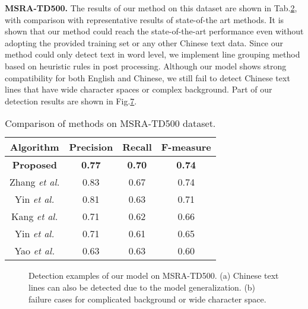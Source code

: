 \documentclass[10pt,twocolumn,letterpaper]{article}
\begin{document}
	\noindent \textbf{MSRA-TD500.} The results of our method on this dataset are shown in Tab.\hyperref[Tab.2]{2}, with comparison with representative results of state-of-the art methods.
	It is shown that our method could reach the state-of-the-art performance even without adopting the provided training set or any other Chinese text data. 
	Since our method could only detect text in word level, we implement line grouping method based on heuristic rules in post processing. 
	Although our model shows strong compatibility for both English and Chinese, we still fail to detect Chinese text lines that have wide character spaces or complex background. 
	Part of our detection results are shown in Fig.\hyperref[Fig.7]{7}.
	
	\begin{table}
		\label{Tab.2}
		\small
		\renewcommand\arraystretch{1.2}
		\centering
		\caption{Comparison of methods on MSRA-TD500 dataset.}
		\begin{tabular}{|c|c|c|c|}
			\hline
			Algorithm & Precision & Recall & F-measure \\
			\hline
			\hline
			\textbf{Proposed} & \textbf{0.77} & \textbf{0.70} & \textbf{0.74} \\
			\hline
			Zhang \emph{et al.} \cite{fcn-text} & 0.83 & 0.67 & 0.74 \\
			\hline
			Yin \emph{et al.} \cite{yin2015multi} & 0.81 & 0.63 & 0.71 \\ %
			\hline
			Kang \emph{et al.} \cite{kang2014orientation} & 0.71 & 0.62 & 0.66 \\ %
			\hline
			Yin \emph{et al.} \cite{mser2} & 0.71 & 0.61 & 0.65 \\ %
			\hline
			Yao \emph{et al.} \cite{yao2012detecting} & 0.63 & 0.63 & 0.60 \\ %
			\hline
		\end{tabular}
	\end{table}
	
	\begin{figure}
		\label{Fig.7}
		\centering	
		
		\caption{Detection examples of our model on MSRA-TD500. (a) Chinese text lines can also be detected due to the model generalization. (b) failure cases for complicated background or wide character space.}
	\end{figure}
	
\end{document}
